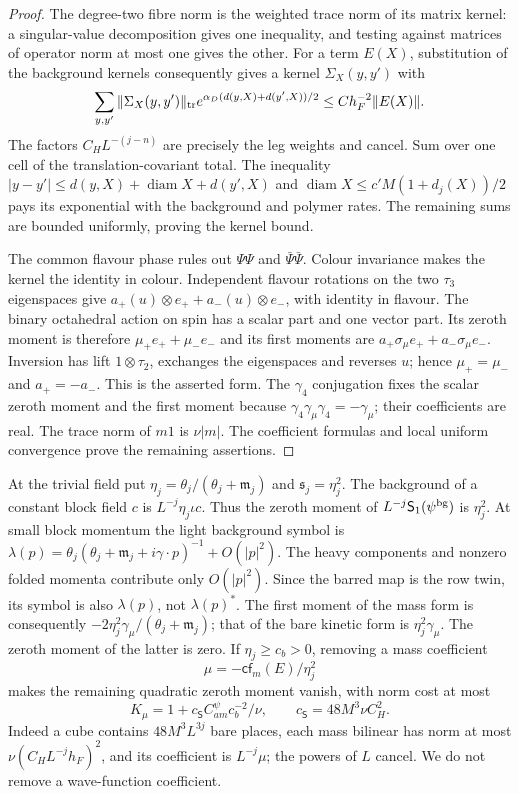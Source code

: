 \documentclass[11pt,letterpaper,reqno]{amsart}
\theoremstyle{definition}
\theoremstyle{remark}
\begin{document}
\begin{proof}
The degree-two fibre norm is the weighted trace norm of its
matrix kernel: a singular-value decomposition gives one
inequality, and testing against matrices of operator norm at
most one gives the other.  For a term $E(X)$, substitution
of the background kernels consequently gives a kernel
$\Sigma_X(y,y')$ with
\[
 \sum_{y,y'}\|\Sigma_X(y,y')\|_{\rm tr}
 e^{\alpha_D(d(y,X)+d(y',X))/2}
                      \le C h_F^{-2}\|E(X)\|.
\]
The factors $C_HL^{-(j-n)}$ are precisely the leg weights and
cancel.  Sum over one cell of the translation-covariant total.
The inequality
$|y-y'|\le d(y,X)+\operatorname{diam}X+d(y',X)$ and
$\operatorname{diam}X\le c'M(1+d_j(X))/2$ pays its exponential
with the background and polymer rates.  The remaining sums
are bounded uniformly, proving the kernel bound.

The common flavour phase rules out $\Psi\Psi$ and
$\bar\Psi\bar\Psi$.  Colour invariance makes the kernel the
identity in colour.  Independent flavour rotations on the
two $\tau_3$ eigenspaces give
$a_+(u)\otimes e_++a_-(u)\otimes e_-$, with identity in flavour.
The binary octahedral action on spin has a scalar part and one
vector part.  Its zeroth moment is therefore
$\mu_+e_++\mu_-e_-$ and its first moments are
$a_+\sigma_\mu e_++a_-\sigma_\mu e_-$.
Inversion has lift $1\otimes\tau_2$, exchanges the eigenspaces
and reverses $u$; hence $\mu_+=\mu_-$ and $a_+=-a_-$.
This is the asserted form.  The $\gamma_4$ conjugation fixes
the scalar zeroth moment and the first moment because
$\gamma_4\gamma_\mu\gamma_4=-\gamma_\mu$; their coefficients
are real.  The trace norm of $m1$ is $\nu|m|$.
The coefficient formulas and local uniform convergence prove
the remaining assertions.
\end{proof}

At the trivial field put $\eta_j=\theta_j/(\theta_j+\mathfrak m_j)$
and $\mathfrak s_j=\eta_j^2$.
The background of a constant block field $c$ is
$L^{-j}\eta_j\iota c$.  Thus the zeroth moment of
$L^{-j}\mathsf S_1(\psi^{\rm bg})$ is $\eta_j^2$.
At small block momentum the light background symbol is
$\lambda(p)=\theta_j(\theta_j+\mathfrak m_j+i\gamma\cdot p)^{-1}
+O(|p|^2)$.  The heavy components and nonzero folded momenta
contribute only $O(|p|^2)$.  Since the barred map is the row
twin, its symbol is also $\lambda(p)$, not $\lambda(p)^*$.
The first moment of the mass form is consequently
$-2\eta_j^2\gamma_\mu/(\theta_j+\mathfrak m_j)$; that of the
bare kinetic form is $\eta_j^2\gamma_\mu$.  The zeroth moment
of the latter is zero.  If $\eta_j\ge c_b>0$, removing a mass
coefficient
\[
 \mu=-\mathsf{cf}_m(E)/\eta_j^2
\]
makes the remaining quadratic zeroth moment vanish, with
norm cost at most
\[
 K_\mu=1+c_{\mathsf S}C^\psi_{am}c_b^{-2}/\nu,
 \qquad c_{\mathsf S}=48M^3\nu C_H^2.
\]
Indeed a cube contains $48M^3L^{3j}$ bare places, each mass
bilinear has norm at most $\nu(C_HL^{-j}h_F)^2$, and its
coefficient is $L^{-j}\mu$; the powers of $L$ cancel.
We do not remove a wave-function coefficient.
\end{document}
